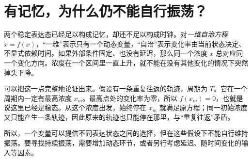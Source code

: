 \section{有记忆，为什么仍不能自行振荡？}
两个稳定表达态已经足以构成记忆，却还不足以构成时钟。对\emph{一维自治方程} $\dot x=f(x)$，“一维”表示只有一个动态变量，“自治”表示变化率由当前状态决定、不显式依赖时间。如果外部条件固定、也没有延迟，那么同一个浓度 $x$ 总对应同一个变化方向。浓度在一个区间里一直上升，就不能在没有其他变化的情况下突然掉头下降。

可以把这一点完整地论证出来。假设有一条重复往返的轨迹，周期为 $T$。它在一个周期内一定有最高浓度 $x_m$。最高点处的变化率为零，所以 $f(x_m)=0$，也就是说这里已经是稳态。从这个浓度出发，始终停在 $x_m$ 就满足原方程；同一初始浓度又只能产生一条轨迹，因此原来的轨迹也只能停在那里，与“重复往返”矛盾。

所以，一个变量可以提供不同表达状态之间的选择，但在这些假设下不能自行维持振荡。要寻找持续振荡，需要增加动态环节，或者另行考虑延迟、随时间变化的输入等因素。
